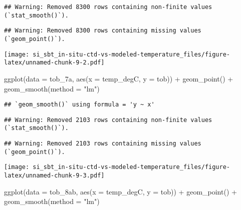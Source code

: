 \documentclass[
]{article}
\newenvironment{Shaded}{\begin{snugshade}}{\end{snugshade}}
\newcommand{\AttributeTok}[1]{\textcolor[rgb]{0.77,0.63,0.00}{#1}}
\newcommand{\FunctionTok}[1]{\textcolor[rgb]{0.00,0.00,0.00}{#1}}
\newcommand{\NormalTok}[1]{#1}
\newcommand{\SpecialCharTok}[1]{\textcolor[rgb]{0.00,0.00,0.00}{#1}}
\newcommand{\StringTok}[1]{\textcolor[rgb]{0.31,0.60,0.02}{#1}}
\begin{document}
\begin{verbatim}
## Warning: Removed 8300 rows containing non-finite values (`stat_smooth()`).
\end{verbatim}

\begin{verbatim}
## Warning: Removed 8300 rows containing missing values (`geom_point()`).
\end{verbatim}

\texttt{[image: si\_sbt\_in-situ-ctd-vs-modeled-temperature\_files/figure-latex/unnamed-chunk-9-2.pdf]}

\begin{Shaded}
\begin{Highlighting}[]
\FunctionTok{ggplot}\NormalTok{(}\AttributeTok{data =}\NormalTok{ tob\_7a, }\FunctionTok{aes}\NormalTok{(}\AttributeTok{x =}\NormalTok{ temp\_degC, }\AttributeTok{y =}\NormalTok{ tob)) }\SpecialCharTok{+} \FunctionTok{geom\_point}\NormalTok{() }\SpecialCharTok{+} \FunctionTok{geom\_smooth}\NormalTok{(}\AttributeTok{method =} \StringTok{"lm"}\NormalTok{)}
\end{Highlighting}
\end{Shaded}

\begin{verbatim}
## `geom_smooth()` using formula = 'y ~ x'
\end{verbatim}

\begin{verbatim}
## Warning: Removed 2103 rows containing non-finite values (`stat_smooth()`).
\end{verbatim}

\begin{verbatim}
## Warning: Removed 2103 rows containing missing values (`geom_point()`).
\end{verbatim}

\texttt{[image: si\_sbt\_in-situ-ctd-vs-modeled-temperature\_files/figure-latex/unnamed-chunk-9-3.pdf]}

\begin{Shaded}
\begin{Highlighting}[]
\FunctionTok{ggplot}\NormalTok{(}\AttributeTok{data =}\NormalTok{ tob\_8ab, }\FunctionTok{aes}\NormalTok{(}\AttributeTok{x =}\NormalTok{ temp\_degC, }\AttributeTok{y =}\NormalTok{ tob)) }\SpecialCharTok{+} \FunctionTok{geom\_point}\NormalTok{() }\SpecialCharTok{+} \FunctionTok{geom\_smooth}\NormalTok{(}\AttributeTok{method =} \StringTok{"lm"}\NormalTok{)}
\end{Highlighting}
\end{Shaded}
\end{document}

